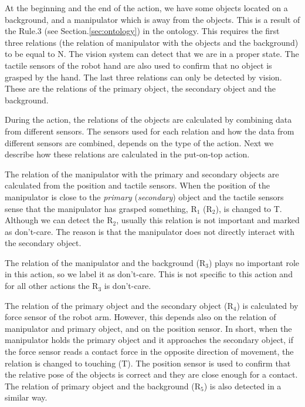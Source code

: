 At the beginning and the end of the action, we have some objects located on a background, and a manipulator which is away from the objects.
This is a result of the Rule.3 (see Section.\ref{sec:ontology}) in the ontology.
This requires the first three relations (the relation of manipulator with the objects and the background) to be equal to N.
The vision system can detect that we are in a proper state.
The tactile sensors of the robot hand are also used to confirm that no object is grasped by the hand.
The last three relations can only be detected by vision.
These are the relations of the primary object, the secondary object and the background.

During the action, the relations of the objects are calculated by combining data from different sensors.
The sensors used for each relation and how the data from different sensors are combined, depends on the type of the action.
Next we describe how these relations are calculated in the put-on-top action.

The relation of the manipulator with the primary and secondary objects are calculated from the position and tactile sensors.
When the position of the manipulator is close to the \textit{primary} (\textit{secondary}) object and the tactile sensors sense that the manipulator has grasped something,
$\text{R}_1$ ($\text{R}_2$), is changed to T.
Although we can detect the $\text{R}_2$, usually this relation is not important and marked as don't-care.
The reason is that the manipulator does not directly interact with the secondary object.

The relation of the manipulator and the background ($\text{R}_3$) plays no important role in this action, so we label it as don't-care.
This is not specific to this action and for all other actions the $\text{R}_3$ is don't-care.


The relation of the primary object and the secondary object ($\text{R}_4$) is calculated by force sensor of the robot arm.
However, this depends also on the relation of manipulator and primary object, and on the position sensor.
In short, when the manipulator holds the primary object and it approaches the secondary object,
if the force sensor reads a contact force in the opposite direction of movement, the relation is changed to touching (T).
The position sensor is used to confirm that the relative pose of the objects is correct and they are close enough for a contact.
The relation of primary object and the background ($\text{R}_5$) is also detected in a similar way.

